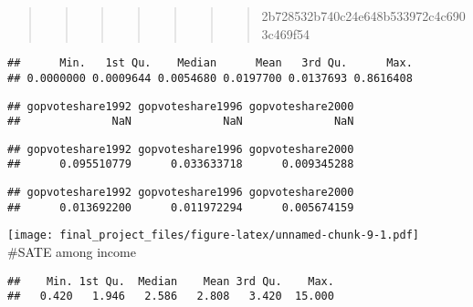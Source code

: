 \documentclass[
]{article}
\newenvironment{Shaded}{\begin{snugshade}}{\end{snugshade}}
\newcommand{\FunctionTok}[1]{\textcolor[rgb]{0.00,0.00,0.00}{#1}}
\newcommand{\NormalTok}[1]{#1}
\newcommand{\SpecialCharTok}[1]{\textcolor[rgb]{0.00,0.00,0.00}{#1}}
\begin{document}
\begin{quote}
\begin{quote}
\begin{quote}
\begin{quote}
\begin{quote}
\begin{quote}
\begin{quote}
2b728532b740c24e648b533972c4c6903c469f54
\end{quote}
\end{quote}
\end{quote}
\end{quote}
\end{quote}
\end{quote}
\end{quote}

\begin{verbatim}
##      Min.   1st Qu.    Median      Mean   3rd Qu.      Max. 
## 0.0000000 0.0009644 0.0054680 0.0197700 0.0137693 0.8616408
\end{verbatim}

\begin{verbatim}
## gopvoteshare1992 gopvoteshare1996 gopvoteshare2000 
##              NaN              NaN              NaN
\end{verbatim}

\begin{verbatim}
## gopvoteshare1992 gopvoteshare1996 gopvoteshare2000 
##      0.095510779      0.033633718      0.009345288
\end{verbatim}

\begin{verbatim}
## gopvoteshare1992 gopvoteshare1996 gopvoteshare2000 
##      0.013692200      0.011972294      0.005674159
\end{verbatim}

\texttt{[image: final\_project\_files/figure-latex/unnamed-chunk-9-1.pdf]}
\#SATE among income

\begin{Shaded}
\end{Shaded}

\begin{verbatim}
##    Min. 1st Qu.  Median    Mean 3rd Qu.    Max. 
##   0.420   1.946   2.586   2.808   3.420  15.000
\end{verbatim}
\end{document}
